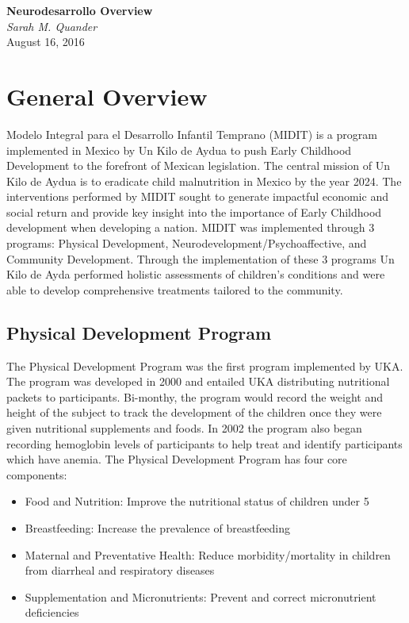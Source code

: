 \documentclass{article}
\begin{document}
   \begin{center}
      \Large\textbf{Neurodesarrollo Overview}\\
      \large\textit{Sarah M. Quander} \\
      \large{August 16, 2016}
   \end{center}

\section{General Overview}
Modelo Integral para el Desarrollo Infantil Temprano (MIDIT) is a program implemented in Mexico by Un Kilo de Aydua to push Early Childhood Development to the forefront of Mexican legislation. The central mission of Un Kilo de Aydua is to eradicate child malnutrition in Mexico by the year 2024. The interventions performed by MIDIT sought to generate impactful economic and social return and provide key insight into the importance of Early Childhood development when developing a nation. MIDIT was implemented through 3 programs: Physical Development, Neurodevelopment/Psychoaffective, and Community Development. Through the implementation of these 3 programs Un Kilo de Ayda performed holistic assessments of children's conditions and were able to develop comprehensive treatments tailored to the community. 

\subsection{Physical Development Program}
The Physical Development Program was the first program implemented by UKA. The program was developed in 2000 and entailed UKA distributing nutritional packets to participants. Bi-monthy, the program would record the weight and height of the subject to track the development of the children once they were given nutritional supplements and foods. In 2002 the program also began recording hemoglobin levels of participants to help treat and identify participants which have anemia. The Physical Development Program has four core components:
\begin{itemize}
\item Food and Nutrition: Improve the nutritional status of children under 5
\item Breastfeeding: Increase the prevalence of breastfeeding 
\item Maternal and Preventative Health: Reduce morbidity/mortality in children from diarrheal and respiratory diseases
\item Supplementation and Micronutrients: Prevent and correct micronutrient deficiencies  
\end{itemize}
\end{document}
